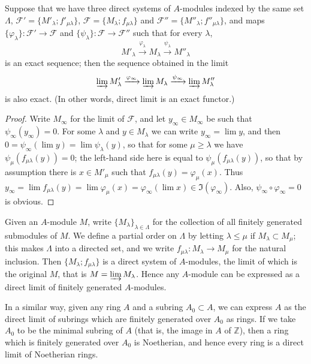 \begin{theorem}\label{thm:A2}
Suppose that we have three direct systems of $A$-modules indexed by the same
set $\Lambda$, $\mathcal{F}' = \{M'_\lambda; f'_{\mu\lambda}\}$, $\mathcal{F} = \{M_\lambda; f_{\mu\lambda}\}$ and
$\mathcal{F}'' = \{M''_\lambda; f''_{\mu\lambda}\}$, and maps $\{\varphi_\lambda\}\colon \mathcal{F}' \to \mathcal{F}$ and
$\{\psi_\lambda\}\colon \mathcal{F} \to \mathcal{F}''$ such that for every $\lambda$,
\[
  M'_\lambda \xrightarrow{\varphi_\lambda} M_\lambda \xrightarrow{\psi_\lambda} M''_\lambda
\]
is an exact sequence; then the sequence obtained in the limit
\[
  \varinjlim M'_\lambda \xrightarrow{\varphi_\infty} \varinjlim M_\lambda \xrightarrow{\psi_\infty} \varinjlim M''_\lambda
\]
is also exact. (In other words, direct limit is an exact functor.)
\end{theorem}

\begin{proof}
Write $M_\infty$ for the limit of $\mathcal{F}$, and let $y_\infty \in M_\infty$ be such that
$\psi_\infty(y_\infty) = 0$. For some $\lambda$ and $y \in M_\lambda$ we can write $y_\infty = \lim y$, and then
$0 = \psi_\infty(\lim y) = \lim \psi_\lambda(y)$, so that for some $\mu \ge \lambda$ we have
$\psi_\mu(f_{\mu\lambda}(y)) = 0$; the left-hand side here is equal to
$\psi_\mu(f_{\mu\lambda}(y))$, so that by assumption there is $x \in M'_\mu$ such that
$f_{\mu\lambda}(y) = \varphi_\mu(x)$. Thus $y_\infty = \lim f_{\mu\lambda}(y) = \lim \varphi_\mu(x) =
\varphi_\infty(\lim x) \in \Im(\varphi_\infty)$. Also, $\psi_\infty \circ \varphi_\infty = 0$ is obvious.
\end{proof}

Given an $A$-module $M$, write $\{M_\lambda\}_{\lambda \in \Lambda}$ for the collection of all finitely
generated submodules of $M$. We define a partial order on $\Lambda$ by letting
$\lambda \le \mu$ if $M_\lambda \subset M_\mu$; this makes $\Lambda$ into a directed set, and we write
$f_{\mu\lambda}\colon M_\lambda \to M_\mu$ for the natural inclusion. Then $\{M_\lambda; f_{\mu\lambda}\}$ is a
direct system of $A$-modules, the limit of which is the original $M$, that is
$M = \varinjlim M_\lambda$. Hence any $A$-module can be expressed as a direct limit of
finitely generated $A$-modules.

In a similar way, given any ring $A$ and a subring $A_0 \subset A$, we can express
$A$ as the direct limit of subrings which are finitely generated over $A_0$ as
rings. If we take $A_0$ to be the minimal subring of $A$ (that is, the image in $A$
of $\mathbb{Z}$), then a ring which is finitely generated over $A_0$ is Noetherian, and
hence every ring is a direct limit of Noetherian rings.

